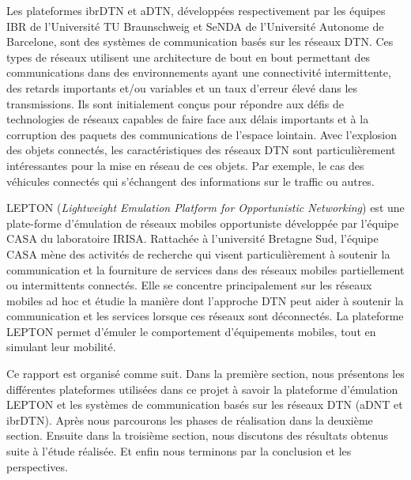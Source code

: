 \documentclass[a4paper,10pt]{article}
\begin{document}
Les plateformes ibrDTN et aDTN, développées respectivement par les équipes IBR de l’Université TU Braunschweig et SeNDA de l’Université Autonome de Barcelone, sont des systèmes de communication basés sur les réseaux DTN. Ces types de réseaux utilisent une architecture de bout en bout permettant des communications dans des environnements ayant une connectivité intermittente, des retards importants et/ou variables et un taux d'erreur élevé dans les transmissions. Ils sont initialement conçus pour répondre aux défis de technologies de réseaux capables de faire face aux délais importants et à la corruption des paquets des communications de l'espace lointain. 
Avec l'explosion des objets connectés, les caractéristiques des réseaux DTN sont particulièrement intéressantes pour la mise en réseau de ces objets. Par exemple, le cas des véhicules connectés qui s'échangent des informations sur le traffic ou autres. \par

LEPTON (\textit{Lightweight Emulation Platform for Opportunistic Networking}) est une plate-forme d’émulation de réseaux mobiles opportuniste développée par l’équipe CASA du laboratoire IRISA. Rattachée à l'université Bretagne Sud, l'équipe CASA mène des activités de recherche qui visent particulièrement à soutenir la communication et la fourniture de services dans des réseaux mobiles partiellement ou intermittents connectés. Elle se concentre principalement sur les réseaux mobiles ad hoc et étudie la manière dont l'approche DTN peut aider à soutenir la communication et les services lorsque ces réseaux sont déconnectés. La plateforme LEPTON permet d'émuler le comportement d’équipements mobiles, tout en simulant leur mobilité. \par

Ce rapport est organisé comme suit. Dans la première section, nous présentons les différentes plateformes utilisées dans ce projet à savoir la plateforme d'émulation LEPTON et les systèmes de communication basés sur les réseaux DTN (aDNT et ibrDTN). Après nous parcourons les phases de réalisation dans la deuxième section. Ensuite dans la troisième section, nous discutons des résultats obtenus suite à l'étude réalisée. Et enfin nous terminons par la conclusion et les perspectives. \par

\newpage
\end{document}
